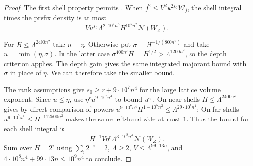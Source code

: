\begin{proof}
The first shell property permits .
When $f^2\le V^2 u^{2s_0}\mathcal W_j$, the shell integral times the prefix density is at most
\[
 V u^{s_0}\Lambda^{2\cdot10^6n^3}H^{10^5n^2}\mathcal N(W_Z).
\]

For $H\le\Lambda^{2400n^2}$ take $u=\eta$.
Otherwise put $\sigma=H^{-1/(800n^2)}$ and take $u=\min(\eta,\sigma)$.
In the latter case $\sigma^{400n^2}H=H^{1/2}>\Lambda^{1200n^2}$, so the depth criterion applies.
The depth gain gives the same integrated majorant bound with $\sigma$ in place of $\eta$.
We can therefore take the smaller bound.

The rank assumptions give $s_0\ge r+9\cdot10^7n^4$ for the large lattice volume exponent.
Since $u\le\eta$, use $\eta^r u^{9\cdot10^7n^4}$ to bound $u^{s_0}$.
On near shells $H\le\Lambda^{2400n^2}$ gives by direct comparison of powers $u^{9\cdot10^7n^4}H^{1+10^5n^2}\le
\Lambda^{29\cdot10^7n^4}$;
On far shells $u^{9\cdot10^7n^4}\le H^{-112500n^2}$ makes the same left-hand side at most $1$.
Thus the bound for each shell integral is
\[
 H^{-1}V\eta^r\Lambda^{3\cdot10^8n^4}\mathcal N(W_Z).
\]
Sum over $H=2^i$ using $\sum_i 2^{-i}=2$, $\Lambda\ge2$, $V\le\Lambda^{99\cdot13n}$, and
$4\cdot10^8n^4+99\cdot13n\le10^9n^4$ to conclude.
\end{proof}

